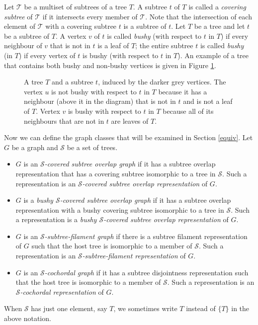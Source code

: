 \documentclass[
final
]{dmtcs-episciences}        \usepackage{graphics, amsthm, amsmath, amssymb, algorithm, algorithmic}
\begin{document}
Let $\mathcal{T}$ be a multiset of subtrees of a tree $T$.
A subtree $t$ of $T$ is called
a {\em covering subtree} of 
$\mathcal{T}$ 
if it intersects every member of $\mathcal{T}$. 
Note that the intersection of each element of $\mathcal{T}$ with a covering subtree $t$ is a subtree of $t$.
Let $T$ be a tree and let $t$ be a subtree of $T$.
A vertex $v$ of $t$ is called {\em bushy} 
(with respect to $t$ in $T$)
if every neighbour of $v$ that is not in $t$ is a leaf of $T$; the entire subtree $t$ is called {\em bushy} 
(in $T$) 
if every vertex of $t$ is bushy
(with respect to $t$ in $T$).  An example of a tree that contains both bushy and non-bushy vertices is given in Figure \ref{fig:bushinessExample}.
\begin{figure}
\begin{center}
\caption{A tree $T$ and a subtree $t$, induced by the darker grey vertices.  The vertex $u$ is not bushy with respect to $t$ in $T$ because it has a neighbour (above it in the diagram) that is not in $t$ and is not a leaf of $T$.  Vertex $v$ is bushy with respect to $t$ in $T$ because all of its neighbours that are not in $t$ are leaves of $T$. }
\label{fig:bushinessExample}
\end{center}
\end{figure}
Now we can define the graph classes that will be examined in Section \ref{equiv}.
Let $G$ be a graph and $\mathcal{S}$ be a set of trees. 
\begin{itemize}
\item
$G$ is an {\em $\mathcal{S}$-covered subtree overlap graph} if it has a subtree overlap representation that has a covering subtree isomorphic to a tree in $\mathcal{S}$.
Such a representation is an {\em $\mathcal{S}$-covered subtree overlap representation} of $G$. 
\item
$G$ is a {\em bushy $\mathcal{S}$-covered subtree overlap graph} if it has a subtree overlap representation with a bushy covering subtree isomorphic to a tree in $\mathcal{S}$.
Such a representation is a {\em bushy $\mathcal{S}$-covered subtree overlap representation} of $G$. 
\item
$G$ is an {\em $\mathcal{S}$-subtree-filament graph} if there is a subtree filament representation of $G$ such that the host tree is isomorphic to a member of $\mathcal{S}$. Such a representation is an {\em $\mathcal{S}$-subtree-filament representation} of $G$.
\item
$G$ is an {\em $\mathcal{S}$-cochordal graph} if it 
has a subtree disjointness representation such that the host tree is isomorphic to a member of $\mathcal{S}$.
Such a representation is an {\em $\mathcal{S}$-cochordal representation} of $G$. 
\end{itemize}
When $\mathcal{S}$ has just one element, say $T$, we sometimes write $T$ instead of $\{T\}$ in the above notation.
\end{document}
